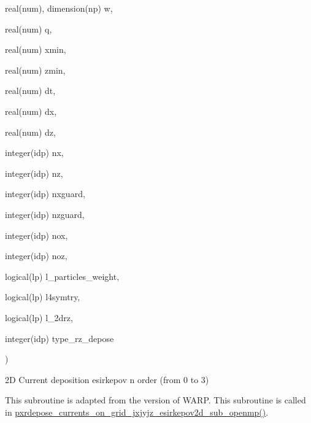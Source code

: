 {\begin{DoxyParamCaption}
\item[{real(num), dimension(np)}]{w, }
\item[{real(num)}]{q, }
\item[{real(num)}]{xmin, }
\item[{real(num)}]{zmin, }
\item[{real(num)}]{dt, }
\item[{real(num)}]{dx, }
\item[{real(num)}]{dz, }
\item[{integer(idp)}]{nx, }
\item[{integer(idp)}]{nz, }
\item[{integer(idp)}]{nxguard, }
\item[{integer(idp)}]{nzguard, }
\item[{integer(idp)}]{nox, }
\item[{integer(idp)}]{noz, }
\item[{logical(lp)}]{l\+\_\+particles\+\_\+weight, }
\item[{logical(lp)}]{l4symtry, }
\item[{logical(lp)}]{l\+\_\+2drz, }
\item[{integer(idp)}]{type\+\_\+rz\+\_\+depose}
\end{DoxyParamCaption}
)}\hypertarget{current__deposition__2d_8_f90_a8b3dd693be6a41b342722e15aa4880de}{}\label{current__deposition__2d_8_f90_a8b3dd693be6a41b342722e15aa4880de}


2D Current deposition esirkepov n order (from 0 to 3) 

This subroutine is adapted from the version of W\+A\+RP. This subroutine is called in \hyperlink{current__deposition__2d_8_f90_a7384ad64cf4beca09ab1a45d8c323395}{pxrdepose\+\_\+currents\+\_\+on\+\_\+grid\+\_\+jxjyjz\+\_\+esirkepov2d\+\_\+sub\+\_\+openmp()}. 
